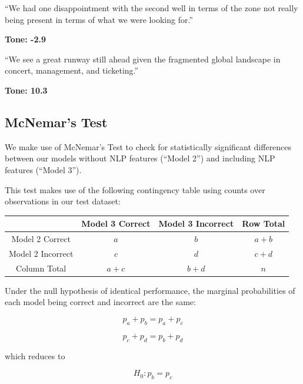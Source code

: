 \documentclass{article}[11pt]
\begin{document}
    \begin{em}
        ``We had one disappointment with the second well in terms of the zone not really being present in terms of what we were looking for.''
    \end{em}

    \textbf{Tone: -2.9}

    \begin{em}
        ``We see a great runway still ahead given the fragmented global landscape in concert, management, and ticketing.''
    \end{em}

    \textbf{Tone: 10.3}

    \clearpage
    \newpage
    \subsection{McNemar's Test}

    \label{sec:mcnemars-test}

    We make use of McNemar's Test to check for statistically significant differences between our models without NLP features (``Model 2'') and including NLP features (``Model 3'').

    This test makes use of the following contingency table using counts over observations in our test dataset:

    \begin{center}
        \begin{tabular}{|c|c|c|c|}
            \hline 
                & Model 3 Correct & Model 3 Incorrect & Row Total\tabularnewline
            \hline 
            \hline 
            Model 2 Correct & $a$ & $b$ & $a+b$\tabularnewline
            \hline 
            Model 2 Incorrect & $c$ & $d$ & $c+d$\tabularnewline
            \hline 
            Column Total & $a+c$ & $b+d$ & $n$\tabularnewline
            \hline 
        \end{tabular}
    \par\end{center}

    Under the null hypothesis of identical performance, the marginal probabilities of each model being correct and incorrect are the same: 

    \[
    p_{a}+p_{b}=p_{a}+p_{c}
    \]

    \[
    p_{c}+p_{d}=p_{b}+p_{d}
    \]

    which reduces to

    \[
    H_{0}:p_{b}=p_{c}
    \]
\end{document}

